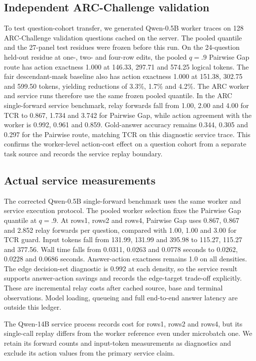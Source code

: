 \documentclass[11pt]{article}
\begin{document}
\subsection{Independent ARC-Challenge validation}
To test question-cohort transfer, we generated Qwen-0.5B worker traces on 128 ARC-Challenge validation questions cached on the server. The pooled quantile and the 27-panel test residues were frozen before this run. On the 24-question held-out residue at one-, two- and four-row edits, the pooled $q=.9$ Pairwise Gap route has action exactness 1.000 at 146.33, 297.71 and 574.25 logical tokens. The fair descendant-mask baseline also has action exactness 1.000 at 151.38, 302.75 and 599.50 tokens, yielding reductions of 3.3\%, 1.7\% and 4.2\%. The ARC worker and service runs therefore use the same frozen pooled quantile. In the ARC single-forward service benchmark, relay forwards fall from 1.00, 2.00 and 4.00 for TCR to 0.867, 1.734 and 3.742 for Pairwise Gap, while action agreement with the worker is 0.992, 0.961 and 0.859. Gold-answer accuracy remains 0.344, 0.305 and 0.297 for the Pairwise route, matching TCR on this diagnostic service trace. This confirms the worker-level action-cost effect on a question cohort from a separate task source and records the service replay boundary.

\subsection{Actual service measurements}
The corrected Qwen-0.5B single-forward benchmark uses the same worker and service execution protocol. The pooled worker selection fixes the Pairwise Gap quantile at $q=.9$. At rows1, rows2 and rows4, Pairwise Gap uses 0.867, 0.867 and 2.852 relay forwards per question, compared with 1.00, 1.00 and 3.00 for TCR guard. Input tokens fall from 131.99, 131.99 and 395.98 to 115.27, 115.27 and 377.56. Wall time falls from 0.0311, 0.0263 and 0.0778 seconds to 0.0262, 0.0228 and 0.0686 seconds. Answer-action exactness remains 1.0 on all densities. The edge decision-set diagnostic is 0.992 at each density, so the service result supports answer-action savings and records the edge-target trade-off explicitly. These are incremental relay costs after cached source, base and terminal observations. Model loading, queueing and full end-to-end answer latency are outside this ledger.

The Qwen-14B service process records cost for rows1, rows2 and rows4, but its single-call replay differs from the worker reference even under microbatch one. We retain its forward counts and input-token measurements as diagnostics and exclude its action values from the primary service claim.
\end{document}
